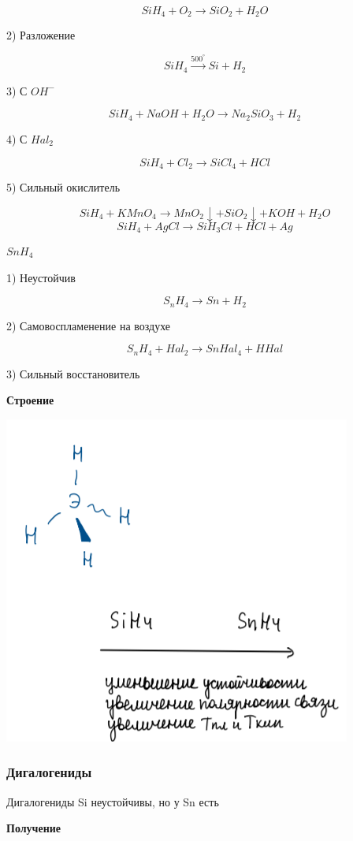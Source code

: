 \documentclass[14pt,a4paper]{scrartcl}
\begin{document}
$$SiH_4 + O_2 \rightarrow SiO_2 + H_2O$$

2) Разложение

$$SiH_4 \xrightarrow{500^{\circ}} Si + H_2$$

3) С $OH^-$

$$SiH_4 + NaOH + H_2O \rightarrow Na_2SiO_3 + H_2$$

4) С $Hal_2$

$$SiH_4 + Cl_2 \rightarrow SiCl_4 + HCl$$

5) Сильный окислитель

$$SiH_4 + KMnO_4 \rightarrow MnO_2\downarrow + SiO_2\downarrow + KOH + H_2O$$
$$SiH_4 + AgCl \rightarrow SiH_3Cl + HCl + Ag$$

$SnH_4$

1) Неустойчив 

$$S_nH_4 \rightarrow Sn + H_2$$

2) Самовоспламенение на воздухе

$$S_nH_4 + Hal_2 \rightarrow SnHal_4 + HHal$$

3) Сильный восстановитель

\textbf{Строение}

\includegraphics{10v1.png}

\subsubsection{Дигалогениды}

Дигалогениды Si неустойчивы, но у Sn есть

\textbf{Получение}
\end{document}

